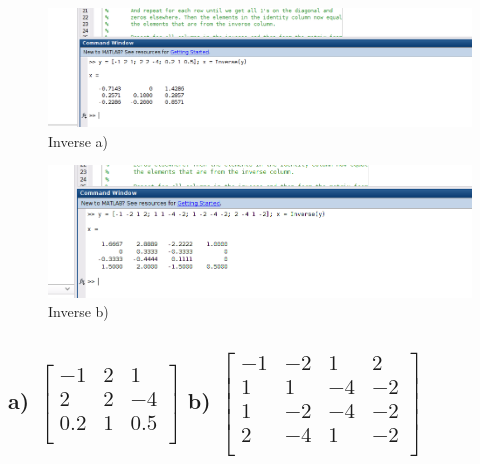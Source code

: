 \documentclass{report}
\begin{document}
    \subsection*{}
    \begin{figure}[h!]
                \includegraphics[width=\linewidth]{Inverse_a).png}
                \caption{Inverse a)}
                \label{fig:Inverse a)}
    \end{figure}

            

    \begin{figure}[h!]
                \includegraphics[width=\linewidth]{Inverse_b).png}
                \caption{Inverse b)}
                \label{fig:Inverse b)}
    \end{figure}


        \subsection*{a) $\begin{bmatrix}
            -1 & 2 & 1\\
            2 & 2 & -4\\
            0.2 & 1 & 0.5\\
            \end{bmatrix}$ b) $\begin{bmatrix}
                -1 & -2 & 1 & 2\\
                1 & 1 & -4 & -2\\
                1 & -2 & -4 & -2\\
                2 & -4 & 1 & -2\\
                \end{bmatrix}$}
            
            
                



























\end{document}
